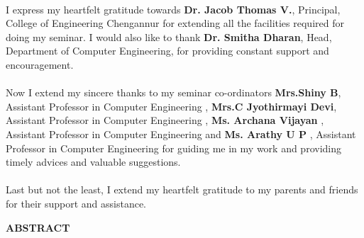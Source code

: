 \documentclass[a4paper,12pt,oneside]{article}
\begin{document}
\paragraph{}
I express my heartfelt gratitude towards \textbf{Dr. Jacob Thomas V.}, Principal, College
of Engineering Chengannur for extending all the facilities required for doing my seminar.
I would also like to thank \textbf{Dr. Smitha Dharan}, Head, Department of Computer
Engineering, for providing constant support and encouragement.
\paragraph{}
Now I extend my sincere thanks to my seminar co-ordinators \textbf{Mrs.Shiny B}, Assistant
Professor in Computer Engineering , \textbf{Mrs.C Jyothirmayi Devi}, Assistant
Professor in Computer Engineering , \textbf{Ms. Archana Vijayan} , Assistant
Professor in Computer Engineering and \textbf{Ms. Arathy U P} , Assistant
Professor in Computer Engineering for guiding me in my work and providing timely
advices and valuable suggestions.
\paragraph{}
Last but not the least, I extend my heartfelt gratitude to my parents and friends for
their support and assistance.	

\newpage

\begin{center}
\large{\textbf{ABSTRACT}}
\end{center}
\vspace{6ex}
\paragraph{}
\end{document}
